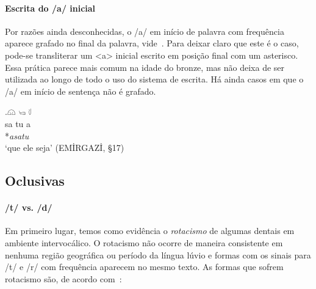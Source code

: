 \paragraph{Escrita do /a/ inicial} Por razões ainda desconhecidas, o /a/ em
início de palavra com frequência aparece grafado no final da palavra,
vide~\Next. Para deixar claro que este é o caso, pode-se transliterar um <a>
inicial escrito em posição final com um asterisco.
Essa prática parece mais comum na idade do bronze, mas não deixa de ser
utilizada ao longo de todo o uso do sistema de escrita.
Há ainda casos em que o /a/ em início de sentença não é grafado.

\exg.\Large 𔗔 \Large  𔑢 \Large 𔗷\\
sa tu a\\
*\emph{asatu}\\
`que ele seja' (EMİRGAZİ, §17)



\subsection{Oclusivas}

\paragraph{/t/ vs. /d/}
Em primeiro lugar, temos como evidência o \emph{rotacismo} de algumas dentais em
ambiente intervocálico.
O rotacismo não ocorre de maneira consistente em nenhuma região geográfica ou
período da língua lúvio e formas com os sinais para /t/ e /r/ com frequência
aparecem no mesmo texto.
As formas que sofrem rotacismo são, de acordo
com~\citet[249--50]{MorpurgoDavies1982}:

